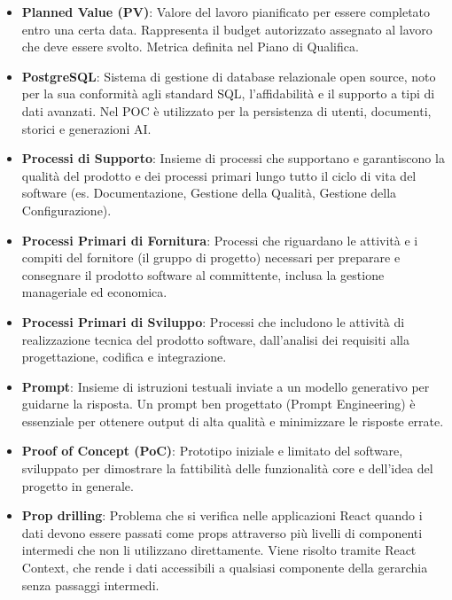 \documentclass[11pt,a4paper]{article}
\begin{document}
\begin{itemize}
\item \textbf{Planned Value (PV)}: Valore del lavoro pianificato per essere completato entro una certa data. Rappresenta il budget autorizzato assegnato al lavoro che deve essere svolto. Metrica definita nel Piano di Qualifica.

\item \textbf{PostgreSQL}: Sistema di gestione di database relazionale 
open source, noto per la sua conformità agli standard SQL, 
l'affidabilità e il supporto a tipi di dati avanzati. Nel POC è utilizzato per la persistenza di utenti, documenti, storici e generazioni AI.

\item \textbf{Processi di Supporto}: Insieme di processi che supportano e garantiscono la qualità del prodotto e dei processi primari lungo tutto il ciclo di vita del software (es. Documentazione, Gestione della Qualità, Gestione della Configurazione).

\item \textbf{Processi Primari di Fornitura}: Processi che riguardano le attività e i compiti del fornitore (il gruppo di progetto) necessari per preparare e consegnare il prodotto software al committente, inclusa la gestione manageriale ed economica.

\item \textbf{Processi Primari di Sviluppo}: Processi che includono le attività di realizzazione tecnica del prodotto software, dall'analisi dei requisiti alla progettazione, codifica e integrazione.

\item \textbf{Prompt}: Insieme di istruzioni testuali inviate a un modello generativo per guidarne la risposta. Un prompt ben progettato (Prompt Engineering) è essenziale per ottenere output di alta qualità e minimizzare le risposte errate.

\item \textbf{Proof of Concept (PoC)}: Prototipo iniziale e limitato del software, sviluppato per dimostrare la fattibilità delle funzionalità core e dell'idea del progetto in generale.

\item \textbf{Prop drilling}: Problema che si verifica nelle applicazioni 
React quando i dati devono essere passati come props attraverso 
più livelli di componenti intermedi che non li utilizzano direttamente. Viene risolto tramite React Context, che rende i dati accessibili a qualsiasi componente della gerarchia senza passaggi intermedi.

\end{itemize}
\newpage
\end{document}
